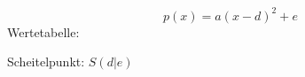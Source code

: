 \documentclass[fleqn,leqno,12pt]{scrartcl} %
\theoremstyle{note}
\begin{document}
\begin{flushleft}
   
\[ p(x)=a(x-d)^2+e \]
Wertetabelle:

Scheitelpunkt: $S(d|e)$



\end{flushleft}
\end{document}
